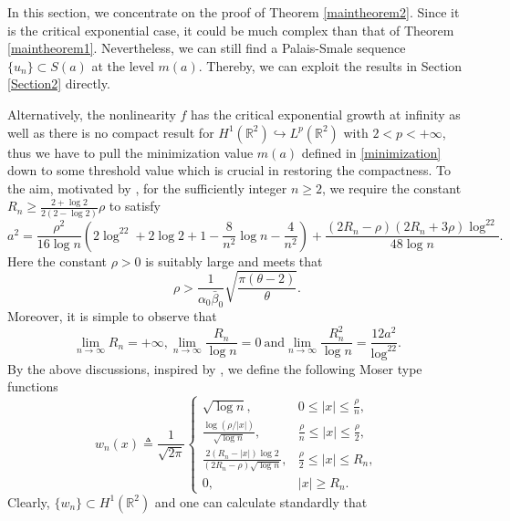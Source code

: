 \documentclass[11pt]{amsart}
\numberwithin{equation}{section}
\theoremstyle{definition}
\newcommand{\R}{\mathbb{R}}
\begin{document}
In this section, we concentrate on the proof of Theorem \ref{maintheorem2}. Since it is the critical exponential case,
it could be much complex than that of Theorem \ref{maintheorem1}.
Nevertheless, we can still find a Palais-Smale sequence $\{u_n\}\subset S(a)$ at the level $m(a)$.
Thereby, we can exploit the results in Section \ref{Section2} directly.

Alternatively, the nonlinearity $f$ has the critical exponential growth at infinity as well as there is no compact result
for $H^1(\R^2)\hookrightarrow L^p(\R^2)$ with $2<p<+\infty$, thus
 we have to pull the minimization value $m(a)$ defined in
\eqref{minimization} down to some threshold value which is crucial in restoring the compactness.
To the aim, motivated by \cite{AS},
for the sufficiently integer $n\geq2$, we require the constant $R_n\geq\frac{2+\log 2}{2(2-\log 2)}\rho$ to satisfy
\begin{equation}\label{Rn}
a^2  =\frac{\rho^2}{16\log n} \left( 2\log^22+2\log2+1-\frac8{n^2}\log n-\frac4{n^2}\right)
+\frac{(2R_n-\rho)(2R_n+3\rho)\log^22}{48\log n}.
\end{equation}
Here the constant $\rho>0$ is suitably large and meets that
\begin{equation}\label{rho}
\rho> \frac{1}{\alpha_0\bar{\beta}_0} \sqrt{\frac{\pi(\theta-2)}{\theta}}.
\end{equation}
Moreover, it is simple to observe that
\begin{equation}\label{Rn2}
\lim_{n\to\infty}R_n=+\infty,
 \lim_{n\to\infty}\frac{R_n}{\log n}=0 ~\text{and}\lim_{n\to\infty}\frac{R_n^2}{\log n}=\frac{12a^2}{\log^22}.
\end{equation}
By the above discussions, inspired by \cite{AY,DSD,Lu2012}, we define the following Moser type functions
\begin{equation}\label{wn}
 w_n(x)\triangleq \frac{1}{\sqrt{2\pi}}
\left\{
  \begin{array}{ll}
\displaystyle   \sqrt{\log n}, & 0\leq|x|\leq \frac \rho n, \\
\displaystyle      \frac{\log(\rho/|x|)}{\sqrt{\log n}}, &\frac \rho n\leq|x|\leq \frac \rho 2, \\
\displaystyle      \frac{2(R_n-|x|)\log 2}{(2R_n-\rho)\sqrt{\log n}}, & \frac\rho2\leq|x|\leq R_n, \\
\displaystyle     0, & |x|\geq R_n.
  \end{array}
\right.
\end{equation}
Clearly, $\{w_n\}\subset H^1(\R^2)$ and one can calculate standardly that
\end{document}
